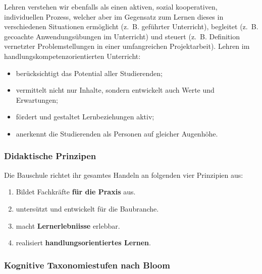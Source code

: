 \documentclass[
11pt,
captions=tableheading,
smallheadings,
headsepline,
footsepline, 
captions=tableheading,
parskip=half-,
]{scrartcl}
\begin{document}
Lehren verstehen wir ebenfalls als einen aktiven, sozial kooperativen, individuellen Prozess, welcher aber im Gegensatz zum Lernen dieses in verschiedenen Situationen ermöglicht (z.~B. geführter Unterricht), begleitet (z.~B. gecoachte Anwendungsübungen im Unterricht) und steuert (z.~B. Definition vernetzter Problemstellungen in einer umfangreichen Projektarbeit). Lehren im handlungskompetenzorientierten Unterricht:
\begin{itemize}
    \item berücksichtigt das Potential aller Studierenden;
    \item vermittelt nicht nur Inhalte, sondern entwickelt auch Werte und Erwartungen;
    \item fördert und gestaltet Lernbeziehungen aktiv;
    \item anerkennt die Studierenden als Personen auf gleicher Augenhöhe.
\end{itemize}

\subsubsection{Didaktische Prinzipen}
Die Bauschule richtet ihr gesamtes Handeln an folgenden vier Prinzipien aus:
\begin{enumerate}
    \item Bildet Fachkräfte \textbf{für die Praxis} aus.
    \item untersützt und entwickelt   für die Baubranche. 
    \item macht \textbf{Lernerlebniisse} erlebbar.
    \item realisiert \textbf{handlungsorientiertes Lernen}.
\end{enumerate}


\subsubsection{Kognitive Taxonomiestufen nach Bloom}
\end{document}
